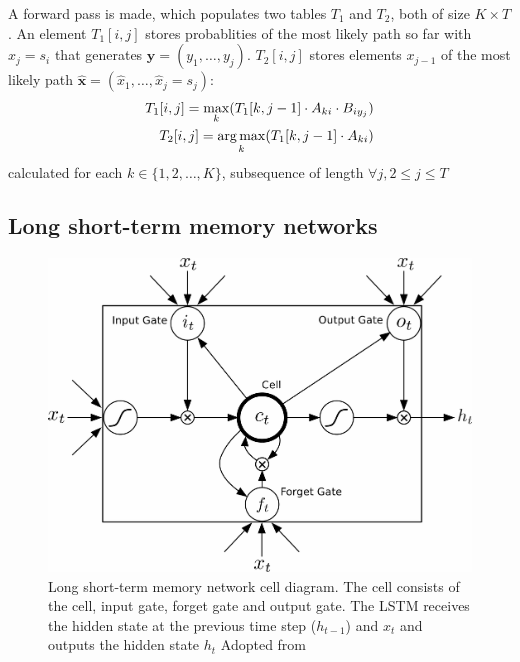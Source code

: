 A forward pass is made, which populates two
tables $T_1$ and $T_2$, both of size
$K \times T$. An element $T_1[i, j]$ stores 
probablities of the most likely path so far with 
$x_j = s_i$ that generates $\textbf{y} = (y_1, \dots, y_j)$.
$T_2[i, j]$ stores elements $x_{j - 1}$ of the most
likely path $\bm{\hat{x}} = (\hat{x}_1, \dots, \hat{x}_j = s_j)$:
\begin{align*}
T_1[i, j] = \max_k (T_1[k, j - 1] \cdot A_{ki} \cdot B_{iy_j}) \\
T_2[i, j] = \operatorname*{arg\,max}_k (T_1[k, j - 1] \cdot A_{ki})
\end{align*}
calculated for each $k \in \{1, 2, \dots, K\}$, subsequence
of length $\forall j, 2 \leq j \leq T$

\subsection{Long short-term memory networks}
\label{sec:lstm}

\begin{figure}
\includegraphics[scale=0.23]{lstm_2.png}
\caption{Long short-term memory network cell diagram. The cell consists of the 
	cell, input gate, forget gate and output gate. The LSTM receives
	the hidden state at the previous time step ($h_{t - 1}$) and $x_t$
	and outputs the hidden state $h_{t}$
	Adopted from 
\citep{graves2013hybrid} }
\label{fig:lstm_arch}
\end{figure}

